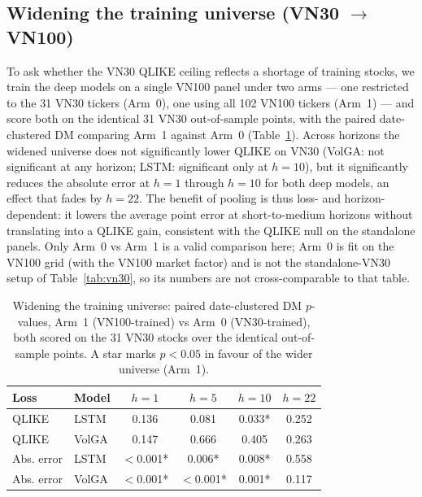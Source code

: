 \documentclass[runningheads]{llncs}
\begin{document}
\subsection{Widening the training universe (VN30 $\to$ VN100)}\label{sec:pool}
To ask whether the VN30 QLIKE ceiling reflects a shortage of training stocks, we train the deep
models on a single VN100 panel under two arms --- one restricted to the 31 VN30 tickers (Arm~0),
one using all 102 VN100 tickers (Arm~1) --- and score both on the identical 31 VN30 out-of-sample
points, with the paired date-clustered DM comparing Arm~1 against Arm~0 (Table~\ref{tab:pool}).
Across horizons the widened universe does not significantly lower QLIKE on VN30 (VolGA: not
significant at any horizon; LSTM: significant only at $h{=}10$), but it significantly reduces the
absolute error at $h{=}1$ through $h{=}10$ for both deep models, an effect that fades by $h{=}22$.
The benefit of pooling is thus loss- and horizon-dependent: it lowers the average point error at
short-to-medium horizons without translating into a QLIKE gain, consistent with the QLIKE null on
the standalone panels. Only Arm~0 vs Arm~1 is a valid comparison here; Arm~0 is fit on the VN100
grid (with the VN100 market factor) and is not the standalone-VN30 setup of Table~\ref{tab:vn30},
so its numbers are not cross-comparable to that table.

\begin{table}[h]\centering
\caption{Widening the training universe: paired date-clustered DM $p$-values, Arm~1 (VN100-trained)
vs Arm~0 (VN30-trained), both scored on the 31 VN30 stocks over the identical out-of-sample points.
A star marks $p<0.05$ in favour of the wider universe (Arm~1).}\label{tab:pool}
\begin{tabular}{llcccc}
\toprule
Loss & Model & $h{=}1$ & $h{=}5$ & $h{=}10$ & $h{=}22$ \\
\midrule
QLIKE & LSTM & 0.136 & 0.081 & 0.033* & 0.252 \\
QLIKE & VolGA & 0.147 & 0.666 & 0.405 & 0.263 \\
Abs. error & LSTM & $<$0.001* & 0.006* & 0.008* & 0.558 \\
Abs. error & VolGA & $<$0.001* & $<$0.001* & 0.001* & 0.117 \\
\bottomrule
\end{tabular}
\end{table}
\end{document}
